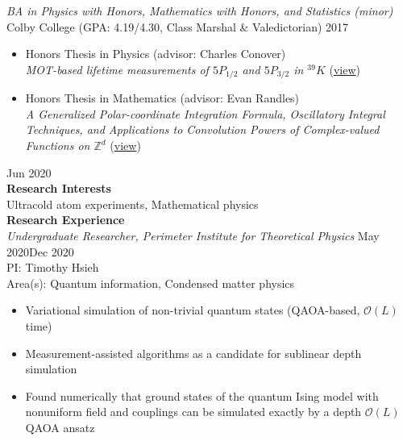 \documentclass[10pt]{article}
\begin{document}
\noindent \textit{BA in Physics with Honors, Mathematics with Honors, and Statistics (minor)}\\
Colby College (GPA: 4.19/4.30, Class Marshal \& Valedictorian) \hfill 2017\vspace{-2pt}

\begin{itemize}
	\setlength\itemsep{-1pt}
	\item Honors Thesis in Physics (advisor: Charles Conover)\\
	\textit{MOT-based lifetime measurements of $5P_{1/2}$ and $5P_{3/2}$ in $^{39}K$} (\href{https://digitalcommons.colby.edu/honorstheses/1298/}{view})
	
	\item Honors Thesis in Mathematics (advisor: Evan Randles)\\ 
	\indent \textit{A Generalized Polar-coordinate Integration Formula, Oscillatory Integral Techniques, and Applications to Convolution Powers of Complex-valued Functions on $\mathbb{Z}^d$} (\href{https://digitalcommons.colby.edu/honorstheses/1293/}{view})
\end{itemize}



\hfill  Jun 2020\\




\noindent \large{\textbf{{Research Interests}}}   \normalsize \\  
\noindent Ultracold atom experiments, Mathematical physics\\



\noindent \large{\textbf{{Research Experience}}}   \normalsize \\  
\noindent \textit{Undergraduate Researcher, Perimeter Institute for Theoretical Physics} \hfill May 2020\textendash Dec 2020\\
PI: Timothy Hsieh \\
Area(s): Quantum information, Condensed matter physics \vspace{-5pt}
\begin{itemize}
	\setlength\itemsep{-4pt}
	\item Variational simulation of non-trivial quantum states (QAOA-based, $\mathcal{O}(L)$ time)  
	\item Measurement-assisted algorithms as a candidate for sublinear depth simulation  
	\item Found numerically that ground states of the quantum Ising model with nonuniform field and couplings can be simulated exactly by a depth $\mathcal{O}(L)$ QAOA ansatz
\end{itemize}
\end{document}
